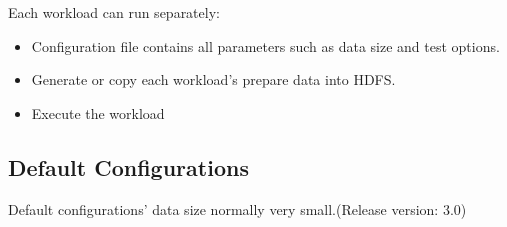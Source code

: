 \documentclass[letterpaper,10pt,english]{sphinxmanual}
\begin{document}
Each workload can run separately:
\begin{itemize}
\item {} 
  Configuration file contains all parameters such as data size and test options.

\item {} 
    Generate or copy each workload's prepare data into HDFS.

\item {} 
        Execute the workload

\end{itemize}


\subsection{Default Configurations}
\label{docs/hibench_intro/index:default-configurations}
Default configurations' data size normally very small.(Release version: 3.0)
\end{document}
